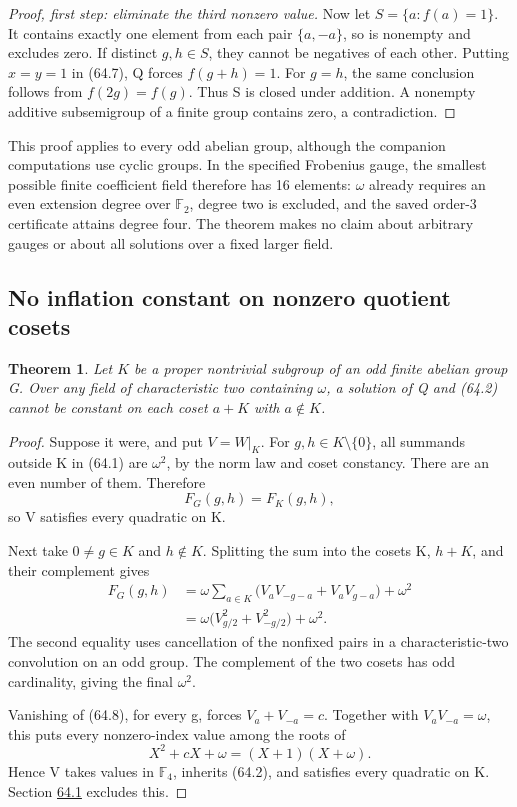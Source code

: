 \documentclass[11pt,reqno]{amsart}
\theoremstyle{plain}
\newtheorem{theorem}{Theorem}[section]
\begin{document}
\begin{proof}[Proof, first step: eliminate the third nonzero value]
Now let \(S=\{a:f(a)=1\}\). It contains exactly one element from
each pair \(\{a,-a\}\), so is nonempty and excludes zero.
If distinct \(g,h\in S\), they cannot be negatives of each other.
Putting \(x=y=1\) in (64.7), Q forces \(f(g+h)=1\).
For \(g=h\), the same conclusion follows from \(f(2g)=f(g)\).
Thus S is closed under addition. A nonempty additive subsemigroup of
a finite group contains zero, a contradiction.
\end{proof}

This proof applies to every odd abelian group, although the companion
computations use cyclic groups. In the specified Frobenius gauge, the
smallest possible finite coefficient field therefore has 16 elements:
\(\omega\) already requires an even extension degree over
\(\mathbb F_2\), degree two is excluded, and the saved order-3
certificate attains degree four. The theorem makes no claim about
arbitrary gauges or about all solutions over a fixed larger field.

\subsection{No inflation constant on nonzero quotient cosets}\label{sec:64.2}

\begin{theorem}
Let \(K\) be a proper nontrivial subgroup of an odd
finite abelian group G. Over any field of characteristic two containing
\(\omega\), a solution of Q and (64.2) cannot be constant on each
coset \(a+K\) with \(a\notin K\).
\end{theorem}

\begin{proof}
Suppose it were, and put \(V=W|_K\). For
\(g,h\in K\setminus\{0\}\), all summands outside K in
(64.1) are \(\omega^2\), by the norm law and coset constancy.
There are an even number of them. Therefore
\[
 F_G(g,h)=F_K(g,h),
\]
so V satisfies every quadratic on K.

Next take \(0\ne g\in K\) and \(h\notin K\). Splitting
the sum into the cosets K, \(h+K\), and their complement gives
\begin{equation*}
 \begin{aligned}
 F_G(g,h)
 &=\omega\sum_{a\in K}
       \bigl(V_aV_{-g-a}+V_aV_{g-a}\bigr)+\omega^2\\
 &=\omega\bigl(V_{g/2}^2+V_{-g/2}^2\bigr)+\omega^2.
 \end{aligned}
 \tag{64.8}
\end{equation*}
The second equality uses cancellation of the nonfixed pairs in a
characteristic-two convolution on an odd group. The complement of
the two cosets has odd cardinality, giving the final \(\omega^2\).

Vanishing of (64.8), for every g, forces
\(V_a+V_{-a}=c\). Together with \(V_aV_{-a}=\omega\), this
puts every nonzero-index value among the roots of
\[
 X^2+cX+\omega=(X+1)(X+\omega).
\]
Hence V takes values in \(\mathbb F_4\), inherits (64.2), and
satisfies every quadratic on K. Section \hyperref[sec:64.1]{64.1} excludes this.
\end{proof}
\end{document}
